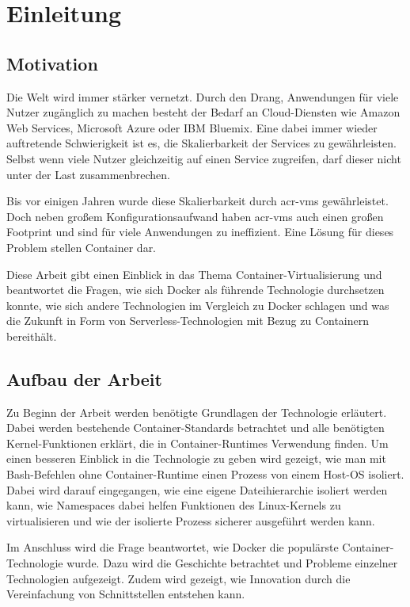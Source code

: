 \chapter{Einleitung}
\label{chap:einleitung}

\section{Motivation}
\label{sec:motivation}
Die Welt wird immer stärker vernetzt. Durch den Drang, Anwendungen für viele Nutzer zugänglich zu machen besteht der Bedarf an Cloud-Diensten wie Amazon Web Services, Microsoft Azure oder IBM Bluemix.
Eine dabei immer wieder auftretende Schwierigkeit ist es, die Skalierbarkeit der Services zu gewährleisten. Selbst wenn viele Nutzer gleichzeitig auf einen Service zugreifen, darf dieser nicht unter der Last zusammenbrechen.

Bis vor einigen Jahren wurde diese Skalierbarkeit durch \glspl{acr-vm} gewährleistet. Doch neben großem Konfigurationsaufwand haben \glspl{acr-vm} auch einen großen Footprint und sind für viele  Anwendungen zu ineffizient. Eine Lösung für dieses Problem stellen Container dar.

Diese Arbeit gibt einen Einblick in das Thema Container-Virtualisierung und beantwortet die Fragen, wie sich Docker als führende Technologie durchsetzen konnte, wie sich andere Technologien im Vergleich zu Docker schlagen und was die Zukunft in Form von Serverless-Technologien mit Bezug zu Containern bereithält.

\section{Aufbau der Arbeit}
\label{sec:aufbau}
Zu Beginn der Arbeit werden benötigte Grundlagen der Technologie erläutert. Dabei werden bestehende Container-Standards betrachtet und alle benötigten Kernel-Funktionen erklärt, die in Container-Runtimes Verwendung finden. Um einen besseren Einblick in die Technologie zu geben wird gezeigt, wie man mit Bash-Befehlen ohne Container-Runtime einen Prozess von einem Host-OS isoliert. Dabei wird darauf eingegangen, wie eine eigene Dateihierarchie isoliert werden kann, wie Namespaces dabei helfen Funktionen des Linux-Kernels zu virtualisieren und wie der isolierte Prozess sicherer ausgeführt werden kann.

Im Anschluss wird die Frage beantwortet, wie Docker die populärste Container-Technologie wurde. Dazu wird die Geschichte betrachtet und Probleme einzelner Technologien aufgezeigt. Zudem wird gezeigt, wie Innovation durch die Vereinfachung von Schnittstellen entstehen kann.

